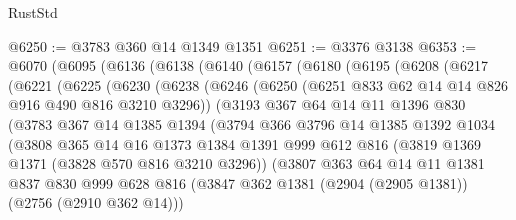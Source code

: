 \begin{lexlean}{RustStd}
\begin{coremodule}
@6250 := @3783 @360 @14 @1349 @1351
@6251 := @3376 @3138
@6353 := @6070
    (@6095
      (@6136
        (@6138
          (@6140
            (@6157
              (@6180
                (@6195
                  (@6208
                    (@6217
                      (@6221
                        (@6225
                          (@6230
                            (@6238
                              (@6246
                                (@6250 (@6251 @833 @62 @14 @14 @826 @916 @490 @816 @3210 @3296))
                                (@3193
                                  @367
                                  @64
                                  @14
                                  @11
                                  @1396
                                  @830
                                  (@3783
                                    @367
                                    @14
                                    @1385
                                    @1394
                                    (@3794
                                      @366
                                      @3796
                                      @14
                                      @1385
                                      @1392
                                      @1034
                                      (@3808
                                        @365
                                        @14
                                        @16
                                        @1373
                                        @1384
                                        @1391
                                        @999
                                        @612
                                        @816
                                        (@3819 @1369 @1371 (@3828 @570 @816 @3210 @3296))
                                        (@3807
                                          @363
                                          @64
                                          @14
                                          @11
                                          @1381
                                          @837
                                          @830
                                          @999
                                          @628
                                          @816
                                          (@3847
                                            @362
                                            @1381
                                            (@2904 (@2905 @1381))
                                            (@2756 (@2910 @362 @14)))

\end{coremodule}
\end{lexlean}
